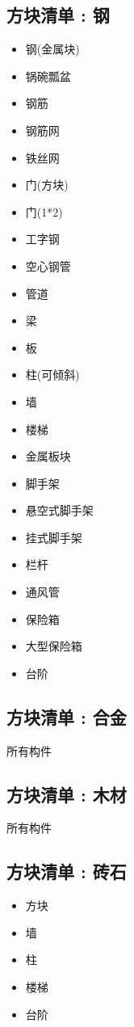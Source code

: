 {  \subsection{方块清单 : 钢}{
      \begin{itemize}
          \item 钢(金属块)
          \item 锅碗瓢盆
          \item 钢筋
          \item 钢筋网
          \item 铁丝网
          \item 门(方块)
          \item 门(1*2)
          \item 工字钢
          \item 空心钢管
          \item 管道
          \item 梁
          \item 板
          \item 柱(可倾斜)
          \item 墙
          \item 楼梯
          \item 金属板块
          \item 脚手架
          \item 悬空式脚手架
          \item 挂式脚手架
          \item 栏杆
          \item 通风管
          \item 保险箱
          \item 大型保险箱
          \item 台阶
      \end{itemize}
  }

  \subsection{方块清单 : 合金}{
      所有构件
  }

  \subsection{方块清单 : 木材}{
      所有构件
  }

  \subsection{方块清单 : 砖石}{
      \begin{itemize}
          \item 方块
          \item 墙
          \item 柱
          \item 楼梯
          \item 台阶
      \end{itemize}

  }
 }